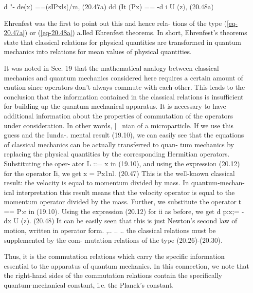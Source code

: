 \documentclass[a4paper,sfsidenotes,colorlinks=true]{tufte-book}
\numberwithin{equation}{section}
\numberwithin{figure}{section}
\begin{document}
{{d "- de(x) ==(sIPxls)/m, (20.47a) dd (It (Px) == -d i
    U (z), (20.48a) 

Ehrenfest was the first to point out this and
    hence rela- tions of the type (\ref{eq-20.47a}) or (\ref{eq-20.48a}) a.lled
    Ehrenfest theorems. In short, Ehrenfest's theorems state that
    classical relations for physical quantities are transformed in
    quantum mechanics into relations for mean values of physical
    quantities.  

It was noted in Sec. 19 that the mathematical analogy
    between classical mechanics and quantum mechanics considered
    here requires a certain amount of caution since operators don't
    always commute with each other. This leads to the conclusion that
    the information contained in the classical relations is
    insufficient for building up the quantum-mechanical apparatus. It
    is necessary to have additional information about the properties
    of commutation of the operators under consideration. In other
    words, ] \ nian of a microparticle. If we use this guess and the
    Iunda-. mental result (19.10), we can easily see that the
    equations of classical mechanics can be actually transferred to
    quan- tum mechanics by replacing the physical quantities by the
    corresponding Hermitian operators. Substituting the oper- ator L
    ::= x in (19.10), and using the expression (20.12) for the
    operator Ii, we get x = Px1nl. (20.47) This is the well-known
    classical result: the velocity is equal to momentum divided by
    mass. In quantum-mechan- ical interpretation this result means
    that the velocity operator is equal to the momentum operator
    divided by the mass. Further, we substitute the operator t == P:c
    in (19.10). Using the expression (20.12) for ii as before, we get
    d p:x;= - dx U (z). (20.48) It can be easily seen that this is
    just Newton's second law of motion, written in operator
    form. ,.. ..  ..  the classical relations must be supplemented by
    the com- mutation relations of the type (20.26)-(20.30). 

    Thus, it is the commutation relations which carry the specific
    information essential to the apparatus of quantum mechanics. In
    this connection, we note that the right-hand sides of the
    commutation relations contain the specifically quantum-mechanical
    constant, i.e. the Planck's constant.

}}
\end{document}
